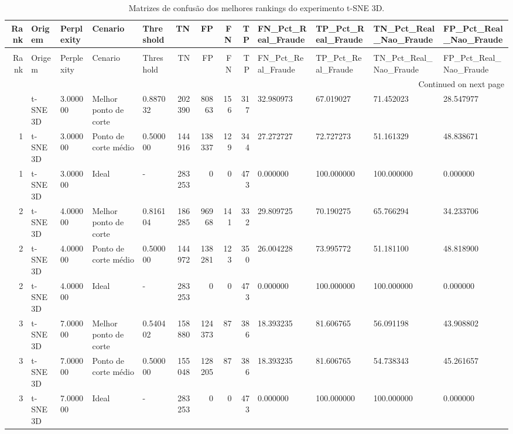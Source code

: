 \begin{longtable}{rllllrrrrllll}
\caption{Matrizes de confusão dos melhores rankings do experimento t-SNE 3D.} \label{tab:matrizes-confusao-ranks-tsne-3d} \\
\toprule
Rank & Origem & Perplexity & Cenario & Threshold & TN & FP & FN & TP & FN\_Pct\_Real\_Fraude & TP\_Pct\_Real\_Fraude & TN\_Pct\_Real\_Nao\_Fraude & FP\_Pct\_Real\_Nao\_Fraude \\
\midrule
\endfirsthead
\caption[]{Matrizes de confusão dos melhores rankings do experimento t-SNE 3D.} \\
\toprule
Rank & Origem & Perplexity & Cenario & Threshold & TN & FP & FN & TP & FN\_Pct\_Real\_Fraude & TP\_Pct\_Real\_Fraude & TN\_Pct\_Real\_Nao\_Fraude & FP\_Pct\_Real\_Nao\_Fraude \\
\midrule
\endhead
\midrule
\multicolumn{13}{r}{Continued on next page} \\
\midrule
\endfoot
\bottomrule
\endlastfoot
1 & t-SNE 3D & 3.000000 & Melhor ponto de corte & 0.887032 & 202390 & 80863 & 156 & 317 & 32.980973 & 67.019027 & 71.452023 & 28.547977 \\
1 & t-SNE 3D & 3.000000 & Ponto de corte médio & 0.500000 & 144916 & 138337 & 129 & 344 & 27.272727 & 72.727273 & 51.161329 & 48.838671 \\
1 & t-SNE 3D & 3.000000 & Ideal & - & 283253 & 0 & 0 & 473 & 0.000000 & 100.000000 & 100.000000 & 0.000000 \\
2 & t-SNE 3D & 4.000000 & Melhor ponto de corte & 0.816104 & 186285 & 96968 & 141 & 332 & 29.809725 & 70.190275 & 65.766294 & 34.233706 \\
2 & t-SNE 3D & 4.000000 & Ponto de corte médio & 0.500000 & 144972 & 138281 & 123 & 350 & 26.004228 & 73.995772 & 51.181100 & 48.818900 \\
2 & t-SNE 3D & 4.000000 & Ideal & - & 283253 & 0 & 0 & 473 & 0.000000 & 100.000000 & 100.000000 & 0.000000 \\
3 & t-SNE 3D & 7.000000 & Melhor ponto de corte & 0.540402 & 158880 & 124373 & 87 & 386 & 18.393235 & 81.606765 & 56.091198 & 43.908802 \\
3 & t-SNE 3D & 7.000000 & Ponto de corte médio & 0.500000 & 155048 & 128205 & 87 & 386 & 18.393235 & 81.606765 & 54.738343 & 45.261657 \\
3 & t-SNE 3D & 7.000000 & Ideal & - & 283253 & 0 & 0 & 473 & 0.000000 & 100.000000 & 100.000000 & 0.000000 \\
\end{longtable}

